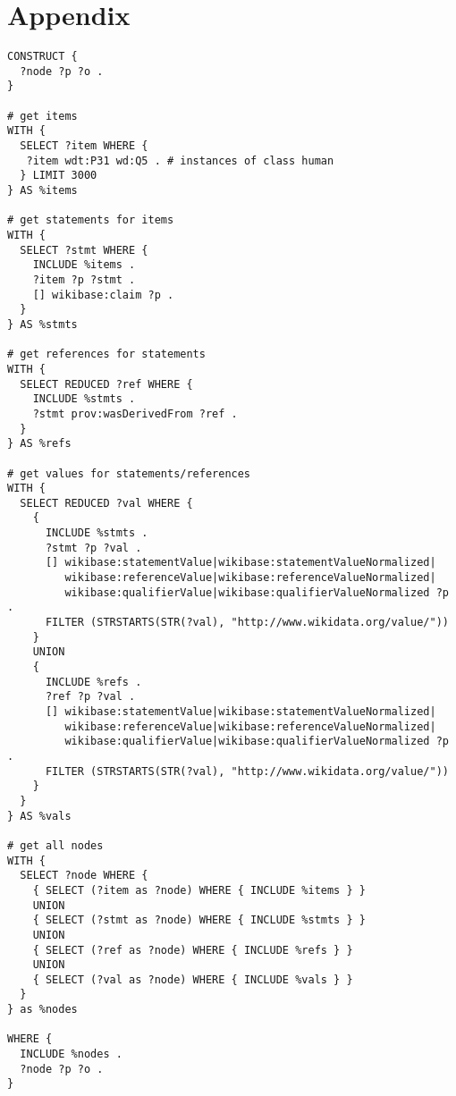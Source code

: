 \chapter{Appendix}

\begin{lstlisting}[language=SPARQL, caption={SPARQL-Query für Person-Items (verwendet NamedSubqueries, eine SPARQL-Erweiterung von BlazeGraph)}, label={lst:sparql-persons}]
CONSTRUCT {
  ?node ?p ?o .
}

# get items
WITH {
  SELECT ?item WHERE {
   ?item wdt:P31 wd:Q5 . # instances of class human
  } LIMIT 3000
} AS %items

# get statements for items
WITH {
  SELECT ?stmt WHERE {
    INCLUDE %items .
    ?item ?p ?stmt .
    [] wikibase:claim ?p .
  }
} AS %stmts

# get references for statements
WITH {
  SELECT REDUCED ?ref WHERE {
    INCLUDE %stmts .
    ?stmt prov:wasDerivedFrom ?ref .
  }
} AS %refs 

# get values for statements/references
WITH {
  SELECT REDUCED ?val WHERE {
    {
      INCLUDE %stmts .
      ?stmt ?p ?val .
      [] wikibase:statementValue|wikibase:statementValueNormalized|
         wikibase:referenceValue|wikibase:referenceValueNormalized|
         wikibase:qualifierValue|wikibase:qualifierValueNormalized ?p .
      FILTER (STRSTARTS(STR(?val), "http://www.wikidata.org/value/"))
    }
    UNION
    {
      INCLUDE %refs .
      ?ref ?p ?val .
      [] wikibase:statementValue|wikibase:statementValueNormalized|
         wikibase:referenceValue|wikibase:referenceValueNormalized|
         wikibase:qualifierValue|wikibase:qualifierValueNormalized ?p .
      FILTER (STRSTARTS(STR(?val), "http://www.wikidata.org/value/"))
    }
  }
} AS %vals 

# get all nodes
WITH {
  SELECT ?node WHERE {
    { SELECT (?item as ?node) WHERE { INCLUDE %items } }
    UNION 
    { SELECT (?stmt as ?node) WHERE { INCLUDE %stmts } } 
    UNION
    { SELECT (?ref as ?node) WHERE { INCLUDE %refs } } 
    UNION
    { SELECT (?val as ?node) WHERE { INCLUDE %vals } }
  }
} as %nodes

WHERE {
  INCLUDE %nodes .
  ?node ?p ?o .
}
\end{lstlisting}
